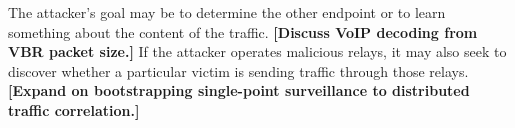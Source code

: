 \documentclass{zarticle}
\def\todo#1{{\color{todocolor}\bfseries [#1]}}
\begin{document}
The attacker's goal may be to determine the other endpoint or to learn
something about the content of the traffic.  \todo{Discuss VoIP
  decoding from VBR packet size.}  If the attacker operates malicious
relays, it may also seek to discover whether a particular victim is
sending traffic through those relays. \todo{Expand on bootstrapping
  single-point surveillance to distributed traffic correlation.}

\nocite{*}\printbibliography
\end{document}
